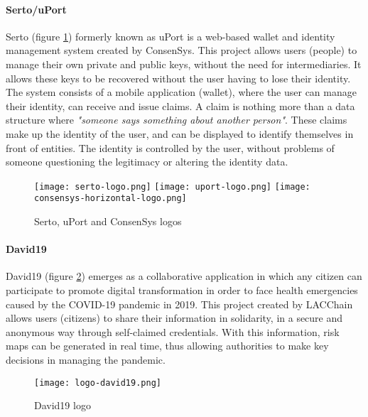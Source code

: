                 \paragraph{Serto/uPort}
                    Serto\cite{serto} (figure \ref{fig:uport}) formerly known as uPort\cite{uport} is a web-based wallet and identity management system created by ConsenSys\cite{consenSys}. This project allows users (people) to manage their own private and public keys, without the need for intermediaries. It allows these keys to be recovered without the user having to lose their identity. The system consists of a mobile application (wallet), where the user can manage their identity, can receive and issue claims. A claim is nothing more than a data structure where \textit{"someone says something about another person"}. These claims make up the identity of the user, and can be displayed to identify themselves in front of entities. The identity is controlled by the user, without problems of someone questioning the legitimacy or altering the identity data.
                    \begin{figure}[h]
                        \centering
                        \texttt{[image: serto-logo.png]}\hfill
                        \texttt{[image: uport-logo.png]}\hfill
                        \texttt{[image: consensys-horizontal-logo.png]}
                        \caption{Serto, uPort and ConsenSys logos}
                        \label{fig:uport}
                    \end{figure}
                    
                \paragraph{David19}
                    David19\cite{david19} (figure \ref{fig:david19}) emerges as a collaborative application in which any citizen can participate to promote digital transformation in order to face health emergencies caused by the COVID-19 pandemic in 2019. This project created by LACChain\cite{lacchain} allows users (citizens) to share their information in solidarity, in a secure and anonymous way through self-claimed credentials. With this information, risk maps can be generated in real time, thus allowing authorities to make key decisions in managing the pandemic.\\
                    \begin{figure}[h]
                        \centering
                        \texttt{[image: logo-david19.png]}
                        \caption{David19 logo}
                        \label{fig:david19}
                    \end{figure}
                    
